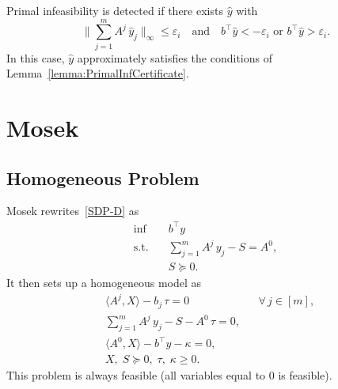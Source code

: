\documentclass[10pt, a4paper]{article}
\newcommand{\skal}[2]{\langle{#1},{#2}\rangle}
\newcommand{\T}{^{\top}}
\begin{document}
Primal infeasibility is detected if there exists $\hat{y}$ with
\[
\Big\lVert \sum_{j=1}^m A^j\, \hat{y}_j \Big\rVert_{\infty} \leq \varepsilon_i
\quad\text{and}\quad b\T \hat{y} < -\varepsilon_i \text{ or } b\T \hat{y} > \varepsilon_i.
\]
In this case, $\hat{y}$ approximately satisfies the conditions of
Lemma~\ref{lemma:PrimalInfCertificate}.



\section{Mosek}


\subsection{Homogeneous Problem}

Mosek rewrites~\eqref{SDP-D} as
\begin{equation}\label{SDP-D2}
  \begin{aligned}
    \inf \quad & b\T y \\
    \text{s.t.} \quad & \sum_{j=1}^m A^j\, y_j - S = A^0, \\
    & S \succeq 0.
  \end{aligned}
\end{equation}
It then sets up a homogeneous model as
\begin{equation}\label{HOM}
  \begin{aligned}
    & \skal{A^j}{X} - b_j\,\tau = 0 && \forall \, j \in [m],\\
    & \sum_{j=1}^m A^j\, y_j - S - A^0\, \tau = 0, \\
    & \skal{A^0}{X} - b\T y - \kappa = 0,\\
    & X,\; S \succeq 0,\; \tau,\; \kappa \geq 0.
  \end{aligned}
\end{equation}
This problem is always feasible (all variables equal to 0 is feasible).
\end{document}
